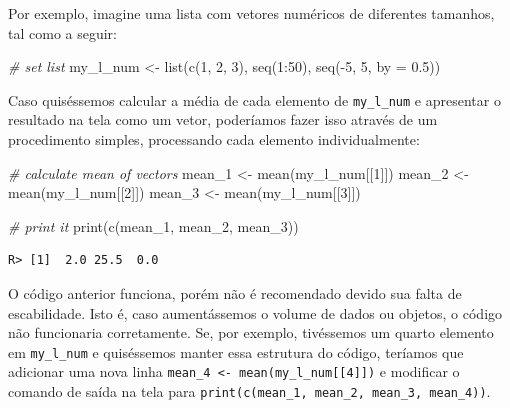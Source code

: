 \documentclass[
  11pt,
]{book}
\newenvironment{Shaded}{\begin{snugshade}}{\end{snugshade}}
\newcommand{\AttributeTok}[1]{\textcolor[rgb]{0.61,0.61,0.61}{#1}}
\newcommand{\CommentTok}[1]{\textcolor[rgb]{0.37,0.37,0.37}{\textit{#1}}}
\newcommand{\DecValTok}[1]{\textcolor[rgb]{0.06,0.06,0.06}{#1}}
\newcommand{\FloatTok}[1]{\textcolor[rgb]{0.06,0.06,0.06}{#1}}
\newcommand{\FunctionTok}[1]{\textcolor[rgb]{0,0,0}{#1}}
\newcommand{\NormalTok}[1]{#1}
\newcommand{\OtherTok}[1]{\textcolor[rgb]{0.37,0.37,0.37}{#1}}
\newcommand{\SpecialCharTok}[1]{\textcolor[rgb]{0,0,0}{#1}}
\begin{document}
Por exemplo, imagine uma lista com vetores numéricos de diferentes tamanhos, tal como a seguir:

\begin{Shaded}
\begin{Highlighting}[]
\CommentTok{\# set list}
\NormalTok{my\_l\_num }\OtherTok{\textless{}{-}} \FunctionTok{list}\NormalTok{(}\FunctionTok{c}\NormalTok{(}\DecValTok{1}\NormalTok{, }\DecValTok{2}\NormalTok{, }\DecValTok{3}\NormalTok{),}
                 \FunctionTok{seq}\NormalTok{(}\DecValTok{1}\SpecialCharTok{:}\DecValTok{50}\NormalTok{),}
                 \FunctionTok{seq}\NormalTok{(}\SpecialCharTok{{-}}\DecValTok{5}\NormalTok{, }\DecValTok{5}\NormalTok{, }\AttributeTok{by =} \FloatTok{0.5}\NormalTok{))}
\end{Highlighting}
\end{Shaded}

Caso quiséssemos calcular a média de cada elemento de \texttt{my\_l\_num} e apresentar o resultado na tela como um vetor, poderíamos fazer isso através de um procedimento simples, processando cada elemento individualmente:

\begin{Shaded}
\begin{Highlighting}[]
\CommentTok{\# calculate mean of vectors}
\NormalTok{mean\_1 }\OtherTok{\textless{}{-}} \FunctionTok{mean}\NormalTok{(my\_l\_num[[}\DecValTok{1}\NormalTok{]])}
\NormalTok{mean\_2 }\OtherTok{\textless{}{-}} \FunctionTok{mean}\NormalTok{(my\_l\_num[[}\DecValTok{2}\NormalTok{]])}
\NormalTok{mean\_3 }\OtherTok{\textless{}{-}} \FunctionTok{mean}\NormalTok{(my\_l\_num[[}\DecValTok{3}\NormalTok{]])}

\CommentTok{\# print it}
\FunctionTok{print}\NormalTok{(}\FunctionTok{c}\NormalTok{(mean\_1, mean\_2, mean\_3))}
\end{Highlighting}
\end{Shaded}

\begin{verbatim}
R> [1]  2.0 25.5  0.0
\end{verbatim}

O código anterior funciona, porém não é recomendado devido sua falta de escabilidade. Isto é, caso aumentássemos o volume de dados ou objetos, o código não funcionaria corretamente. Se, por exemplo, tivéssemos um quarto elemento em \texttt{my\_l\_num} e quiséssemos manter essa estrutura do código, teríamos que adicionar uma nova linha \texttt{mean\_4\ \textless{}-\ mean(my\_l\_num{[}{[}4{]}{]})} e modificar o comando de saída na tela para \texttt{print(c(mean\_1,\ mean\_2,\ mean\_3,\ mean\_4))}.
\end{document}
